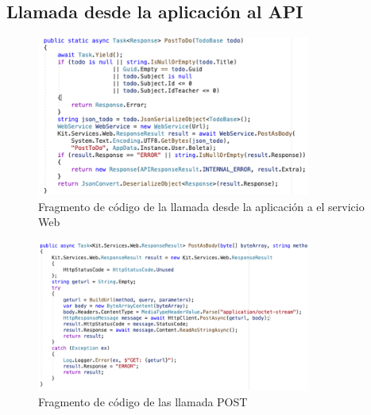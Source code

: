 \documentclass[10pt]{article}
\begin{document}
\subsection{Llamada desde la aplicación al API}
\begin{figure}[H]
    \begin{center}
        \includegraphics[width=0.8\textwidth]{Imagenes/api3.png}
        \caption{Fragmento de código de la llamada desde la aplicación a el servicio Web}
        \label{fig17}
    \end{center}
\end{figure}
\begin{figure}[H]
    \begin{center}
        \includegraphics[width=0.8\textwidth]{Imagenes/api4.png}
        \caption{Fragmento de código de las llamada POST}
        \label{fig18}
    \end{center}
\end{figure}
\end{document}

